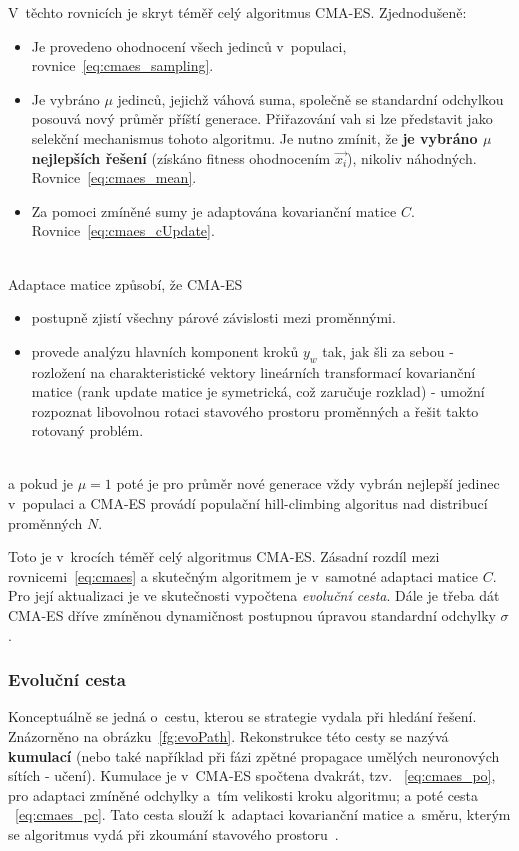 V~těchto rovnicích je skryt téměř celý algoritmus CMA-ES. Zjednodušeně:
\begin{itemize}
    \item Je provedeno ohodnocení všech jedinců v~populaci, rovnice~\ref{eq:cmaes_sampling}.
    \item Je vybráno $\mu$ jedinců, jejichž váhová suma, společně se standardní odchylkou posouvá nový průměr příští generace. Přiřazování vah si lze představit jako selekční mechanismus tohoto algoritmu. Je nutno zmínit, že \textbf{je vybráno $\mu$ nejlepších řešení} (získáno fitness ohodnocením $\Vec{x_i}$), nikoliv náhodných. Rovnice~\ref{eq:cmaes_mean}.
    \item Za pomoci zmíněné sumy je adaptována kovarianční matice $C$.  Rovnice~\ref{eq:cmaes_cUpdate}.
\end{itemize}
\\
Adaptace matice způsobí, že CMA-ES~\cite{CMAES}
\begin{itemize}
    \item postupně zjistí všechny párové závislosti mezi proměnnými.
    \item provede analýzu hlavních komponent kroků $y_w$ tak, jak šli za sebou - rozložení na charakteristické vektory lineárních transformací kovarianční matice (rank update matice je symetrická, což zaručuje rozklad) - umožní rozpoznat libovolnou rotaci stavového prostoru proměnných a řešit takto rotovaný problém.
\end{itemize}
\\
a pokud je $\mu = 1$ poté je pro průměr nové generace vždy vybrán nejlepší jedinec v~populaci a CMA-ES provádí populační hill-climbing algoritus nad distribucí proměnných $N$.

Toto je v~krocích téměř celý algoritmus CMA-ES. Zásadní rozdíl mezi rovnicemi~\ref{eq:cmaes} a skutečným algoritmem je v~samotné adaptaci matice $C$. Pro její aktualizaci je ve skutečnosti vypočtena \emph{evoluční cesta}. Dále je třeba dát CMA-ES dříve zmíněnou dynamičnost postupnou úpravou standardní odchylky $\sigma$.

\subsubsection{Evoluční cesta}
Konceptuálně se jedná o~cestu, kterou se strategie vydala při hledání řešení. Znázorněno na obrázku~\ref{fg:evoPath}. Rekonstrukce této cesty se nazývá \textbf{kumulací} (nebo také například  při fázi zpětné propagace umělých neuronových sítích - učení). Kumulace je v~CMA-ES spočtena dvakrát, tzv. \textbf{}~\ref{eq:cmaes_po}, pro adaptaci zmíněné odchylky a~tím velikosti kroku algoritmu; a poté cesta \textbf{}~\ref{eq:cmaes_pc}. Tato cesta slouží k~adaptaci kovarianční matice a~směru, kterým se algoritmus vydá při zkoumání stavového prostoru~\cite{CMAES}. 


